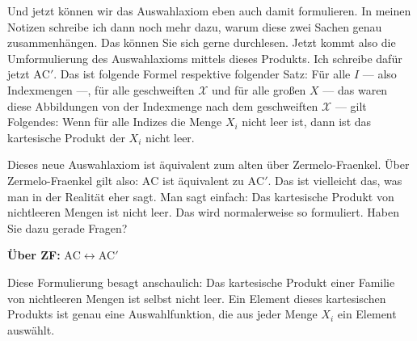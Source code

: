 \begin{spoken-clean}[00:17:30 - 00:19:30]
Und jetzt können wir das Auswahlaxiom eben auch damit formulieren. In meinen Notizen schreibe ich dann noch mehr dazu, warum diese zwei Sachen genau zusammenhängen. Das können Sie sich gerne durchlesen. Jetzt kommt also die Umformulierung des Auswahlaxioms mittels dieses Produkts. Ich schreibe dafür jetzt $\text{AC}'$. Das ist folgende Formel respektive folgender Satz: Für alle $I$ --- also Indexmengen ---, für alle geschweiften $\mathcal{X}$ und für alle großen $X$ --- das waren diese Abbildungen von der Indexmenge nach dem geschweiften $\mathcal{X}$ --- gilt Folgendes: Wenn für alle Indizes die Menge $X_i$ nicht leer ist, dann ist das kartesische Produkt der $X_i$ nicht leer.

Dieses neue Auswahlaxiom ist äquivalent zum alten über Zermelo-Fraenkel. Über Zermelo-Fraenkel gilt also: $\text{AC}$ ist äquivalent zu $\text{AC}'$. Das ist vielleicht das, was man in der Realität eher sagt. Man sagt einfach: Das kartesische Produkt von nichtleeren Mengen ist nicht leer. Das wird normalerweise so formuliert. Haben Sie dazu gerade Fragen?
\end{spoken-clean}

\begin{math-stroke}

\textbf{Über ZF:} $\text{AC} \leftrightarrow \text{AC}'$

\begin{explanation-of-steps}
Diese Formulierung besagt anschaulich: Das kartesische Produkt einer Familie von nichtleeren Mengen ist selbst nicht leer. Ein Element dieses kartesischen Produkts ist genau eine Auswahlfunktion, die aus jeder Menge $X_i$ ein Element auswählt.
\end{explanation-of-steps}
\end{math-stroke}

